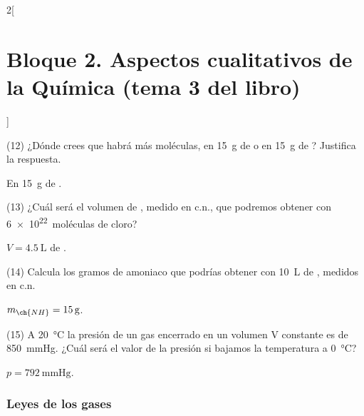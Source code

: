 \documentclass[10pt]{article}
\begin{document}
\begin{multicols}{2}[
    \section{Bloque 2. Aspectos cualitativos de la Química (tema 3 del libro)}
  ]
\begin{exercise}[
    tags    = {},
    topics  = {química,química básica},
    source  = {FQ 1B MGH 2016, p84, e12},
  ]
  (12) ¿Dónde crees que habrá más moléculas, en \SI{15}{g} de  o en
  \SI{15}{g} de ? Justifica la respuesta.
\end{exercise}

\begin{solution}
  En \SI{15}{g} de .
\end{solution}




\begin{exercise}[
    tags    = {},
    topics  = {química,química básica},
    source  = {FQ 1B MGH 2016, p84, e13},
  ]
  (13) ¿Cuál será el volumen de , medido en c.n., que podremos
  obtener con \SI{6e22}{moléculas} de cloro?
\end{exercise}

\begin{solution}
  \( V = \SI{4.5}{\liter} \) de .
\end{solution}




\begin{exercise}[
    tags    = {},
    topics  = {química,química básica},
    source  = {FQ 1B MGH 2016, p84, e14},
  ]
  (14) Calcula los gramos de amoniaco que podrías obtener con \SI{10}{\liter}
  de , medidos en c.n.
\end{exercise}

\begin{solution}
  \( m_{\ch{NH}} = \SI{15}{g} \).
\end{solution}




\begin{exercise}[
    tags    = {},
    topics  = {química,química básica},
    source  = {FQ 1B MGH 2016, p84, e15},
  ]
  (15) A \SI{20}{\celsius} la presión de un gas encerrado en un volumen V constante es de \SI{850}{\mmHg}. ¿Cuál será el valor de la presión si bajamos la temperatura a \SI{0}{\celsius}?
\end{exercise}

\begin{solution}
  \( p = \SI{792}{\mmHg} \).
\end{solution}



\subsubsection{Leyes de los gases}


\end{multicols}
\end{document}
